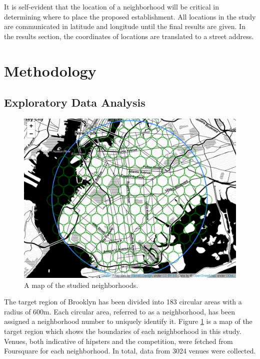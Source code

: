 \documentclass[12pt]{article}
\begin{document}
	It is self-evident that the location of a neighborhood will be critical in determining where to place the proposed establishment.
	All locations in the study are communicated in latitude and longitude until the final results are given.
	In the results section, the coordinates of locations are translated to a street address.

\section{Methodology}
\subsection{Exploratory Data Analysis}

\begin{figure}[h!]
	\includegraphics[width=6.5in]{citymap.png}
  \caption{A map of the studied neighborhoods.}
  \label{fig:citymap}
\end{figure}
	The target region of Brooklyn has been divided into 183 circular areas with a radius of 600m.
	Each circular area, referred to as a neighborhood, has been assigned a neighborhood number to uniquely identify it.
	Figure \ref{fig:citymap} is a map of the target region which shows the boundaries of each neighborhood in this study.
	Venues, both indicative of hipsters and the competition, were fetched from Foursquare for each neighborhood.
	In total, data from 3024 venues were collected.
\end{document}
